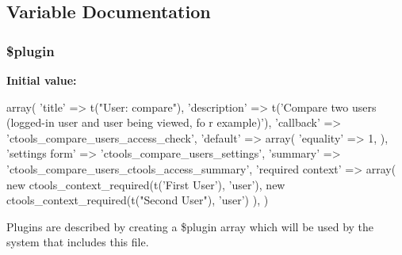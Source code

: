 \subsection{Variable Documentation}
\hypertarget{compare__users_8inc_ada8a7130088351710bb02ed622d6bf65}{
\subsubsection[{\$plugin}]{\setlength{\rightskip}{0pt plus 5cm}\$plugin}}
\label{compare__users_8inc_ada8a7130088351710bb02ed622d6bf65}
{\bfseries Initial value:}
\begin{DoxyCode}
 array(
  'title' => t("User: compare"),
  'description' => t('Compare two users (logged-in user and user being viewed, fo
      r example)'),
  'callback' => 'ctools_compare_users_access_check',
  'default' => array(
    'equality' => 1,
  ),
  'settings form' => 'ctools_compare_users_settings',
  'summary' => 'ctools_compare_users_ctools_access_summary',
  'required context' => array(
    new ctools_context_required(t('First User'), 'user'),
    new ctools_context_required(t("Second User"), 'user')
  ),
)
\end{DoxyCode}
Plugins are described by creating a \$plugin array which will be used by the system that includes this file. 